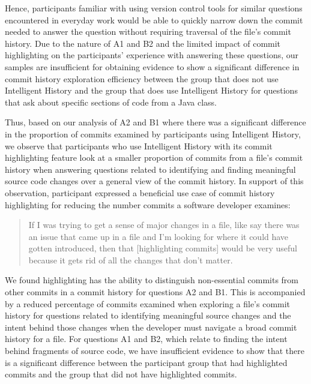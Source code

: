 \begin{center}
\end{center}

Hence, participants familiar with using version control tools for similar questions encountered 
in everyday work would be able to quickly narrow down the commit needed to answer 
the question without requiring traversal of the file's commit history.
Due to the nature of A1 and B2 and the limited impact of commit highlighting 
on the participants' experience with answering these questions,
our samples are insufficient for obtaining evidence to show a significant difference in 
commit history exploration efficiency between the group that does not use Intelligent History 
and the group that does use Intelligent History for questions that ask about specific sections of code from a Java class.

Thus, based on our analysis of A2 and B1 where there was a significant difference in 
the proportion of commits examined by participants using Intelligent History, 
we observe that participants who use Intelligent History with its commit highlighting feature 
look at a smaller proportion of commits from a file's commit history when answering questions related to
identifying and finding meaningful source code changes over a general view of the commit history.
In support of this observation, 
participant  expressed a beneficial use case of commit history highlighting 
for reducing the number commits a software developer examines:

\begin{quote}
  If I was trying to get a sense of major changes in a file, like say there was an issue that came up in a file and I’m looking for where it could have gotten introduced, 
  then that [highlighting commits] would be very useful because it gets rid of all the changes that don’t matter. 
\end{quote}

We found highlighting has the ability to distinguish non-essential commits from other commits in a commit history
for questions A2 and B1.
This is accompanied by a reduced percentage of commits examined when exploring a file's commit history 
for questions related to identifying meaningful source changes 
and the intent behind those changes when the developer must navigate a broad commit history for a file. 
For questions A1 and B2, which relate to finding the intent behind fragments of source code,
we have insufficient evidence to show that there is a significant difference
between the participant group that had highlighted commits and the group that did not have highlighted commits.

